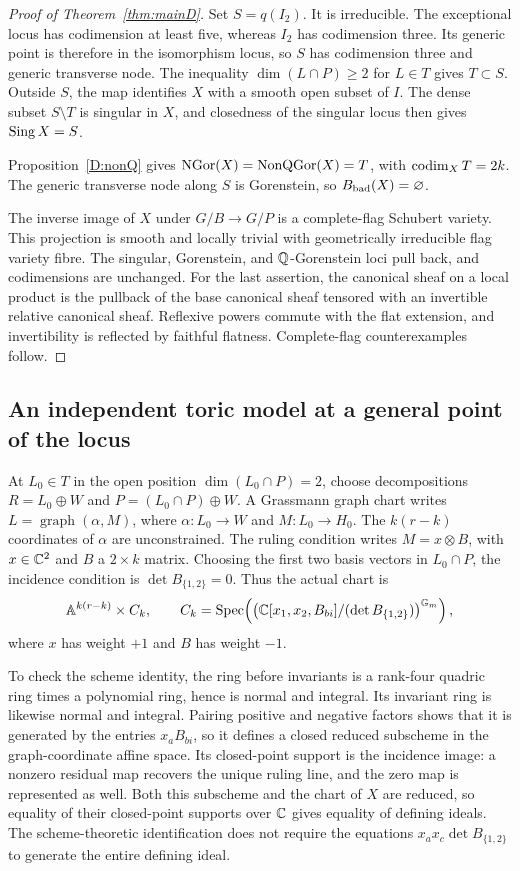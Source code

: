 \begin{proof}[Proof of Theorem~\ref{thm:mainD}]
Set $S=q(I_2)$. It is irreducible. The exceptional locus has codimension at least five, whereas $I_2$ has codimension three. Its generic point is therefore in the isomorphism locus, so $S$ has codimension three and generic transverse node. The inequality $\dim(L\cap P)\ge2$ for $L\in T$ gives $T\subset S$. Outside $S$, the map identifies $X$ with a smooth open subset of $I$. The dense subset $S\setminus T$ is singular in $X$, and closedness of the singular locus then gives $\operatorname{Sing} X=S$.

Proposition~\ref{D:nonQ} gives $\operatorname{NGor}(X)=\operatorname{NonQGor}(X)=T$, with $\operatorname{codim}_XT=2k$. The generic transverse node along $S$ is Gorenstein, so $B_{\mathrm{bad}}(X)=\varnothing$.

The inverse image of $X$ under $G/B\to G/P$ is a complete-flag Schubert variety. This projection is smooth and locally trivial with geometrically irreducible flag variety fibre. The singular, Gorenstein, and $\mathbb Q$-Gorenstein loci pull back, and codimensions are unchanged. For the last assertion, the canonical sheaf on a local product is the pullback of the base canonical sheaf tensored with an invertible relative canonical sheaf. Reflexive powers commute with the flat extension, and invertibility is reflected by faithful flatness. Complete-flag counterexamples follow.
\end{proof}

\subsection{An independent toric model at a general point of the locus}
At $L_0\in T$ in the open position $\dim(L_0\cap P)=2$, choose decompositions $R=L_0\oplus W$ and $P=(L_0\cap P)\oplus W$. A Grassmann graph chart writes $L=\operatorname{graph}(\alpha,M)$, where $\alpha:L_0\to W$ and $M:L_0\to H_0$. The $k(r-k)$ coordinates of $\alpha$ are unconstrained. The ruling condition writes $M=x\otimes B$, with $x\in\mathbb C^2$ and $B$ a $2\times k$ matrix. Choosing the first two basis vectors in $L_0\cap P$, the incidence condition is $\det B_{\{1,2\}}=0$. Thus the actual chart is
\begin{equation}\label{eq:D-toric-chart}
 \mathbb A^{k(r-k)}\times C_k,\qquad
 C_k=\operatorname{Spec}\!\left(\left(\mathbb C[x_1,x_2,B_{bi}]/(\det B_{\{1,2\}})\right)^{\mathbb G_m}\right),
\end{equation}
where $x$ has weight $+1$ and $B$ has weight $-1$.

To check the scheme identity, the ring before invariants is a rank-four quadric ring times a polynomial ring, hence is normal and integral. Its invariant ring is likewise normal and integral. Pairing positive and negative factors shows that it is generated by the entries $x_aB_{bi}$, so it defines a closed reduced subscheme in the graph-coordinate affine space. Its closed-point support is the incidence image: a nonzero residual map recovers the unique ruling line, and the zero map is represented as well. Both this subscheme and the chart of $X$ are reduced, so equality of their closed-point supports over $\mathbb C$ gives equality of defining ideals. The scheme-theoretic identification does not require the equations $x_ax_c\det B_{\{1,2\}}$ to generate the entire defining ideal.

